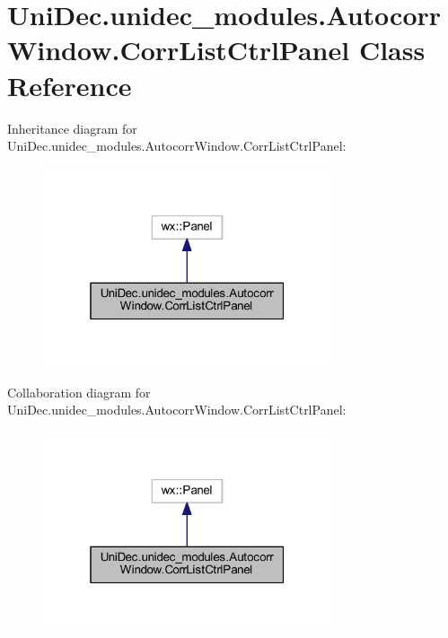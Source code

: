\hypertarget{class_uni_dec_1_1unidec__modules_1_1_autocorr_window_1_1_corr_list_ctrl_panel}{}\section{Uni\+Dec.\+unidec\+\_\+modules.\+Autocorr\+Window.\+Corr\+List\+Ctrl\+Panel Class Reference}
\label{class_uni_dec_1_1unidec__modules_1_1_autocorr_window_1_1_corr_list_ctrl_panel}


Inheritance diagram for Uni\+Dec.\+unidec\+\_\+modules.\+Autocorr\+Window.\+Corr\+List\+Ctrl\+Panel\+:\nopagebreak
\begin{figure}[H]
\begin{center}
\leavevmode
\includegraphics[width=241pt]{class_uni_dec_1_1unidec__modules_1_1_autocorr_window_1_1_corr_list_ctrl_panel__inherit__graph}
\end{center}
\end{figure}


Collaboration diagram for Uni\+Dec.\+unidec\+\_\+modules.\+Autocorr\+Window.\+Corr\+List\+Ctrl\+Panel\+:\nopagebreak
\begin{figure}[H]
\begin{center}
\leavevmode
\includegraphics[width=241pt]{class_uni_dec_1_1unidec__modules_1_1_autocorr_window_1_1_corr_list_ctrl_panel__coll__graph}
\end{center}
\end{figure}
